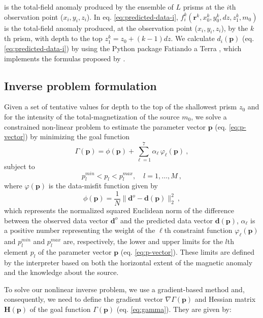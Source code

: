 is the total-field anomaly produced by the ensemble of $L$ prisms at the $i$th observation point ($x_{i}, y_{i}, z_{i}$). 
In eq. \ref{eq:predicted-data-i}, $f_{i}^{k}(\mathbf{r}^{k}, x_{0}^{k}, y_{0}^{k}, dz, z_{1}^{k}, m_{0})$ is the total-field anomaly 
produced, at the observation point ($x_{i}, y_{i}, z_{i}$), by the $k$th prism, with depth to the top $z_{1}^{k} = z_{0} + (k-1)dz$.
We calculate $d_{i} (\mathbf{p})$ (eq. \ref{eq:predicted-data-i}) by using the Python package Fatiando a Terra \citep{uieda-etal2013}, 
which implements the formulas proposed by \cite{plouff1976}.

\subsection{Inverse problem formulation}

Given a set of tentative values for depth to the top of the shallowest prism $z_{0}$ and for the intensity of the 
total-magnetization of the source $m_{0}$, we solve a constrained non-linear problem to estimate the parameter 
vector $\mathbf{p}$ (eq. \ref{eq:p-vector}) by minimizing the goal function
\begin{equation}
\Gamma (\mathbf{p}) = \phi (\mathbf{p}) + \sum\limits^{7}_{\ell =1} \alpha_{\ell} \, \varphi_{\ell}(\mathbf{p}) \: ,
\label{eq:gamma}
\end{equation}
subject to
\begin{equation}
p_{l}^{min} < p_{l} < p_{l}^{max}, \quad l = 1, \dots, M \: ,
\label{eq:inequality-constraint}
\end{equation}
where $\varphi (\mathbf{p})$ is the data-misfit function given by
\begin{equation}\label{eq:misfit}
\phi (\mathbf{p}) = \frac{1}{N} \| \mathbf{d}^{o} - \mathbf{d}(\mathbf{p}) \|_{2}^{2} \: ,
\end{equation}
which represents the normalized squared Euclidean norm of the difference between the observed data vector $\mathbf{d}^{o}$ and 
the predicted data vector $\mathbf{d}(\mathbf{p})$, $\alpha_{\ell}$ is a positive number representing the weight of the 
$\ell$th constraint function $\varphi_{\ell}(\mathbf{p})$ and $p_{l}^{min}$ and $p_{l}^{max}$ are, respectively, the lower and 
upper limits for the $l$th element $p_{l}$ of the parameter vector $\mathbf{p}$ (eq. \ref{eq:p-vector}). 
These limits are defined by the interpreter based on both the horizontal extent of the magnetic anomaly and the knowledge 
about the source.

To solve our nonlinear inverse problem, we use a gradient-based  method and, consequently, we need to define the gradient vector $\nabla \Gamma(\mathbf{p})$ and Hessian matrix $\mathbf{H}(\mathbf{p})$ of the goal function $\Gamma(\mathbf{p})$ (eq. \ref{eq:gamma}). They are given by:

